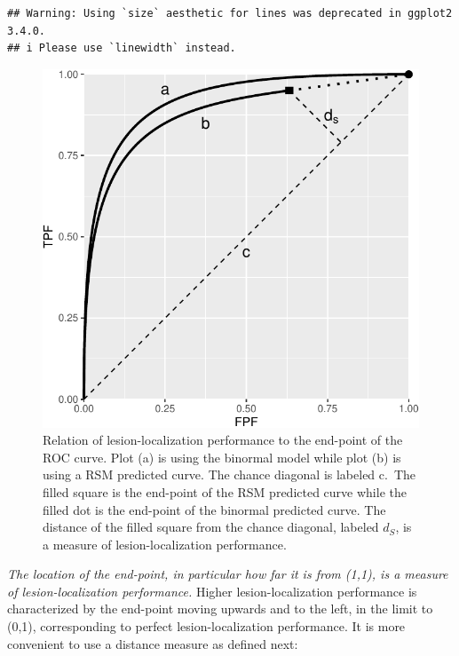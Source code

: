 \documentclass[
]{book}
\begin{document}
\begin{verbatim}
## Warning: Using `size` aesthetic for lines was deprecated in ggplot2 3.4.0.
## i Please use `linewidth` instead.
\end{verbatim}

\begin{figure}
\centering
\includegraphics{10-rsm-search-classification_files/figure-latex/rsm-search-classification-performance-from-roc-curve-1.pdf}
\caption{\label{fig:rsm-search-classification-performance-from-roc-curve}Relation of lesion-localization performance to the end-point of the ROC curve. Plot (a) is using the binormal model while plot (b) is using a RSM predicted curve. The chance diagonal is labeled c.~The filled square is the end-point of the RSM predicted curve while the filled dot is the end-point of the binormal predicted curve. The distance of the filled square from the chance diagonal, labeled \(d_S\), is a measure of lesion-localization performance.}
\end{figure}

\emph{The location of the end-point, in particular how far it is from (1,1), is a measure of lesion-localization performance.} Higher lesion-localization performance is characterized by the end-point moving upwards and to the left, in the limit to (0,1), corresponding to perfect lesion-localization performance. It is more convenient to use a distance measure as defined next:
\end{document}
